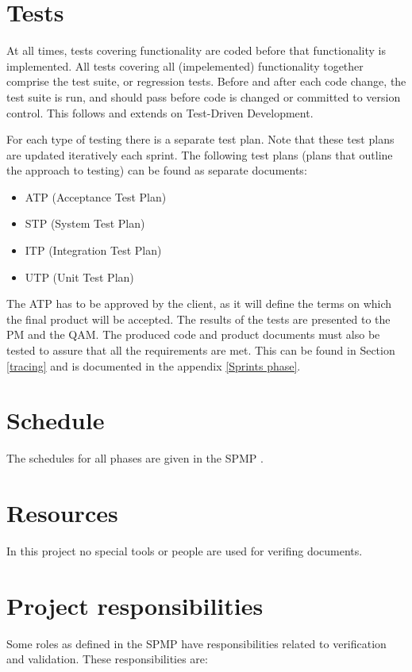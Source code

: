 \documentclass[%
		pathtobase=..,%
		titlefull={Software Validation and Verification Plan},%
		titleabbr=SVVP,%
		version=0.1]{fingerpaint}
\begin{document}
\section{Tests}
At all times, tests covering functionality are coded before that functionality is implemented. 
All tests covering all (impelemented) functionality together comprise the test suite, or regression tests.
Before and after each code change, the test suite is run, and should pass before code is changed or committed to version control. This follows and extends on Test-Driven Development.

 For each type of testing there is a separate test plan. 
Note that these test plans are updated iteratively each sprint. The following test plans (plans that outline the approach to testing) can be found as separate documents:

\begin{itemize}
\item ATP (Acceptance Test Plan) \cite{atp}
\item STP (System Test Plan) \cite{stp}
\item ITP (Integration Test Plan) \cite{itp}
\item UTP (Unit Test Plan) \cite{utp}
\end{itemize}

The ATP \cite{atp} has to be approved by the client, as it will define the terms on which the final product will be accepted. The results of the tests are presented to the PM and the QAM. The produced code and product documents must also be tested to assure that all the requirements are met. This can be found in Section \ref{tracing} and is documented in the appendix \ref{Sprints phase}.

\section{Schedule}
The schedules for all phases are given in the SPMP \cite{spmp}.
\section{Resources}
In this project no special tools or people are used for verifing documents.
\section{Project responsibilities}
    Some roles as defined in the SPMP have responsibilities related to verification and validation.
    These responsibilities are:\\
\end{document}
